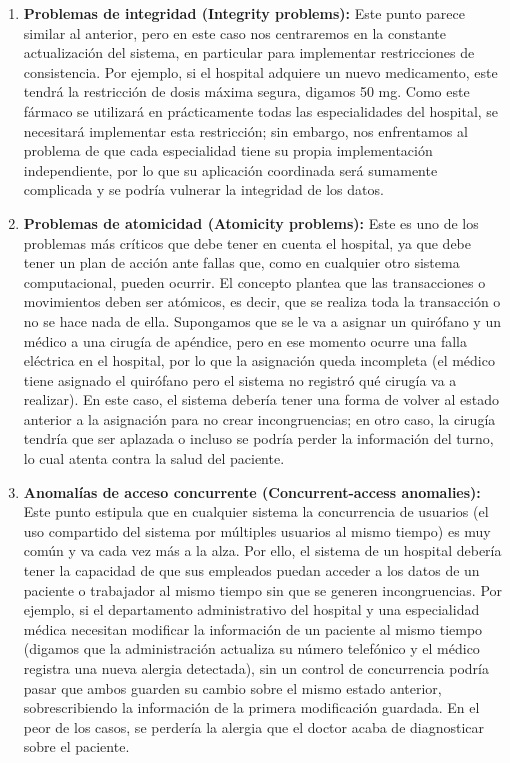 \begin{enumerate}
    \item \textbf{Problemas de integridad (Integrity problems):} Este punto parece similar al anterior, pero en este caso nos centraremos en la constante actualización del sistema, en particular para implementar restricciones de consistencia. Por ejemplo, si el hospital adquiere un nuevo medicamento, este tendrá la restricción de dosis máxima segura, digamos 50 mg. Como este fármaco se utilizará en prácticamente todas las especialidades del hospital, se necesitará implementar esta restricción; sin embargo, nos enfrentamos al problema de que cada especialidad tiene su propia implementación independiente, por lo que su aplicación coordinada será sumamente complicada y se podría vulnerar la integridad de los datos.

    \item \textbf{Problemas de atomicidad (Atomicity problems):} Este es uno de los problemas más críticos que debe tener en cuenta el hospital, ya que debe tener un plan de acción ante fallas que, como en cualquier otro sistema computacional, pueden ocurrir. El concepto plantea que las transacciones o movimientos deben ser atómicos, es decir, que se realiza toda la transacción o no se hace nada de ella. Supongamos que se le va a asignar un quirófano y un médico a una cirugía de apéndice, pero en ese momento ocurre una falla eléctrica en el hospital, por lo que la asignación queda incompleta (el médico tiene asignado el quirófano pero el sistema no registró qué cirugía va a realizar). En este caso, el sistema debería tener una forma de volver al estado anterior a la asignación para no crear incongruencias; en otro caso, la cirugía tendría que ser aplazada o incluso se podría perder la información del turno, lo cual atenta contra la salud del paciente.

    \item \textbf{Anomalías de acceso concurrente (Concurrent-access anomalies):} Este punto estipula que en cualquier sistema la concurrencia de usuarios (el uso compartido del sistema por múltiples usuarios al mismo tiempo) es muy común y va cada vez más a la alza. Por ello, el sistema de un hospital debería tener la capacidad de que sus empleados puedan acceder a los datos de un paciente o trabajador al mismo tiempo sin que se generen incongruencias. Por ejemplo, si el departamento administrativo del hospital y una especialidad médica necesitan modificar la información de un paciente al mismo tiempo (digamos que la administración actualiza su número telefónico y el médico registra una nueva alergia detectada), sin un control de concurrencia podría pasar que ambos guarden su cambio sobre el mismo estado anterior, sobrescribiendo la información de la primera modificación guardada. En el peor de los casos, se perdería la alergia que el doctor acaba de diagnosticar sobre el paciente.


\end{enumerate}
